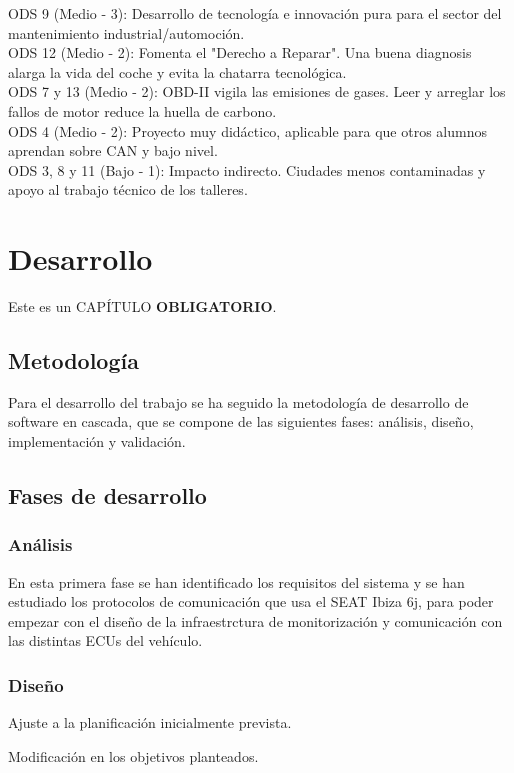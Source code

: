 \documentclass[oneside,12pt]{book}
\begin{document}
ODS 9 (Medio - 3): Desarrollo de tecnología e innovación pura para el sector del mantenimiento industrial/automoción.\\
ODS 12 (Medio - 2): Fomenta el "Derecho a Reparar". Una buena diagnosis alarga la vida del coche y evita la chatarra tecnológica.\\
ODS 7 y 13 (Medio - 2): OBD-II vigila las emisiones de gases. Leer y arreglar los fallos de motor reduce la huella de carbono.\\
ODS 4 (Medio - 2): Proyecto muy didáctico, aplicable para que otros alumnos aprendan sobre CAN y bajo nivel.\\
ODS 3, 8 y 11 (Bajo - 1): Impacto indirecto. Ciudades menos contaminadas y apoyo al trabajo técnico de los talleres.

\chapter{Desarrollo}
%
Este es un CAPÍTULO \textbf{OBLIGATORIO}.

\section{Metodología}

Para el desarrollo del trabajo se ha seguido la metodología de desarrollo de software en cascada, que se compone de las siguientes fases: análisis, diseño, implementación y validación.
\section{Fases de desarrollo}

\subsection{Análisis}

En esta primera fase se han identificado los requisitos del sistema y se han estudiado los protocolos de comunicación que usa el SEAT Ibiza 6j, para poder empezar con el diseño de la infraestrctura de monitorización y comunicación con las distintas ECUs del vehículo.

\subsection{Diseño}

Ajuste a la planificación inicialmente prevista.

Modificación en los objetivos planteados.
\end{document}
